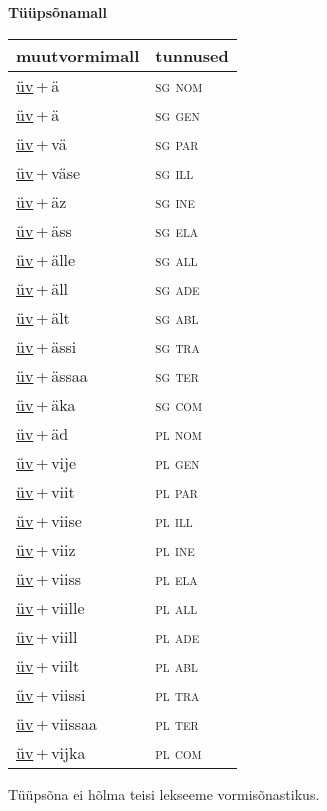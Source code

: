 
\vspace{1.8em}
\begin{minipage}{\textwidth}
\textbf{Tüüpsõnamall \,}\\

\begin{sideways}
\begin{tabular}{l l}
muutvormimall & tunnused \\
\hline
\underline{üv}\,+\,ä & \textsc{ sg nom } \\
\underline{üv}\,+\,ä & \textsc{ sg gen } \\
\underline{üv}\,+\,vä & \textsc{ sg par } \\
\underline{üv}\,+\,väse & \textsc{ sg ill } \\
\underline{üv}\,+\,äz & \textsc{ sg ine } \\
\underline{üv}\,+\,äss & \textsc{ sg ela } \\
\underline{üv}\,+\,älle & \textsc{ sg all } \\
\underline{üv}\,+\,äll & \textsc{ sg ade } \\
\underline{üv}\,+\,ält & \textsc{ sg abl } \\
\underline{üv}\,+\,ässi & \textsc{ sg tra } \\
\underline{üv}\,+\,ässaa & \textsc{ sg ter } \\
\underline{üv}\,+\,äka & \textsc{ sg com } \\
\underline{üv}\,+\,äd & \textsc{ pl nom } \\
\underline{üv}\,+\,vije & \textsc{ pl gen } \\
\underline{üv}\,+\,viit & \textsc{ pl par } \\
\underline{üv}\,+\,viise & \textsc{ pl ill } \\
\underline{üv}\,+\,viiz & \textsc{ pl ine } \\
\underline{üv}\,+\,viiss & \textsc{ pl ela } \\
\underline{üv}\,+\,viille & \textsc{ pl all } \\
\underline{üv}\,+\,viill & \textsc{ pl ade } \\
\underline{üv}\,+\,viilt & \textsc{ pl abl } \\
\underline{üv}\,+\,viissi & \textsc{ pl tra } \\
\underline{üv}\,+\,viissaa & \textsc{ pl ter } \\
\underline{üv}\,+\,vijka & \textsc{ pl com } \\
\end{tabular}
\end{sideways}
\label{tab:tüüpsõnamall-üvä}

\end{minipage}

 
\vspace{1em}
\noindent Tüüpsõna ei hõlma teisi lekseeme vormi\-sõnastikus.
